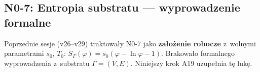 \subsection{N0-7: Entropia substratu --- wyprowadzenie formalne}%
\label{app:H-N07}

\begin{remark}\label{rem:N07-status-before}
Poprzednie sesje (v26--v29) traktowa\l{}y N0-7 jako \textbf{za\l{}o\.zenie
robocze} z~wolnymi parametrami $s_0$, $T_0$:
$S_\Gamma(\varphi) = s_0(\varphi - \ln\varphi - 1)$.
Brakowa\l{}o formalnego wyprowadzenia z~substratu $\Gamma = (V, E)$.
Niniejszy krok A19 uzupe\l{}nia t\k{e} luk\k{e}.
\end{remark}


